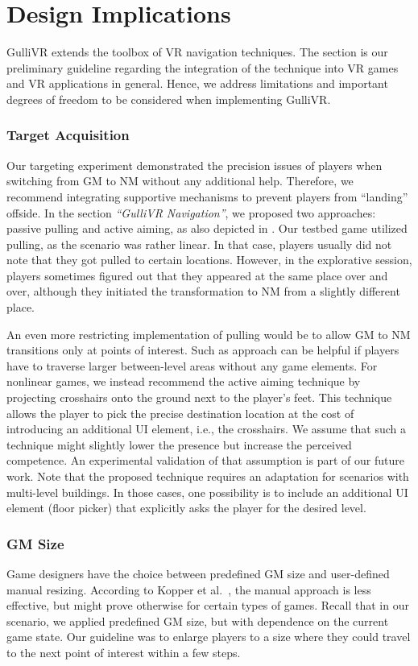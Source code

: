 \documentclass{sigchi}
\begin{document}
\section{Design Implications}
\label{sec:design}

GulliVR extends the toolbox of VR navigation techniques. The section is our preliminary guideline regarding the integration of the technique into VR games and VR applications in general. Hence, we address limitations and important degrees of freedom to be considered when implementing GulliVR.





\subsubsection{Target Acquisition}
Our targeting experiment demonstrated the precision issues of players when switching from GM to NM without any additional help. Therefore, we recommend integrating supportive mechanisms to prevent players from ``landing'' offside. In the section \textit{``GulliVR Navigation''}, we proposed two approaches: passive pulling and active aiming, as also depicted in . Our testbed game utilized pulling, as the scenario was rather linear. In that case, players usually did not note that they got pulled to certain locations. However, in the explorative session, players sometimes figured out that they appeared at the same place over and over, although they initiated the transformation to NM from a slightly different place. 

An even more restricting implementation of pulling would be to allow GM to NM transitions only at points of interest. Such as approach can be helpful if players have to traverse larger between-level areas without any game elements. For nonlinear games, we instead recommend the active aiming technique by projecting crosshairs onto the ground next to the player's feet. This technique allows the player to pick the precise destination location at the cost of introducing an additional UI element, i.e., the crosshairs. We assume that such a technique might slightly lower the presence but increase the perceived competence. An experimental validation of that assumption is part of our future work. Note that the proposed technique requires an adaptation for scenarios with multi-level buildings. In those cases, one possibility is to include an additional UI element (floor picker) that explicitly asks the player for the desired level.
\subsubsection{GM Size}
Game designers have the choice between predefined GM size and user-defined manual resizing. According to Kopper et al.~\cite{kopper2006design}, the manual approach is less effective, but might prove otherwise for certain types of games. Recall that in our scenario, we applied predefined GM size, but with dependence on the current game state. Our guideline was to enlarge players to a size where they could travel to the next point of interest within a few steps.
\end{document}
